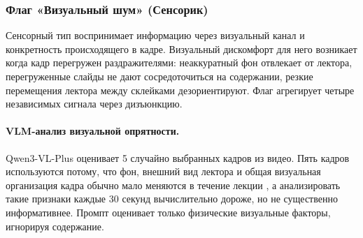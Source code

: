 \subsubsection{Флаг «Визуальный шум» (Сенсорик)}
\label{subsubsec:sensor}

Сенсорный тип воспринимает информацию через визуальный канал и конкретность
происходящего в кадре. Визуальный дискомфорт для него возникает когда кадр
перегружен раздражителями: неаккуратный фон отвлекает от лектора,
перегруженные слайды не дают сосредоточиться на содержании,
резкие перемещения лектора между склейками дезориентируют.
Флаг агрегирует четыре независимых сигнала через дизъюнкцию.

\paragraph{VLM-анализ визуальной опрятности.}

Qwen3-VL-Plus оценивает 5 случайно выбранных кадров из видео.
Пять кадров используются потому, что фон, внешний вид лектора и общая визуальная организация кадра обычно мало меняются в течение лекции
, а анализировать такие признаки каждые 30 секунд вычислительно дороже, но не существенно информативнее.
Промпт оценивает только физические визуальные факторы, игнорируя содержание.

